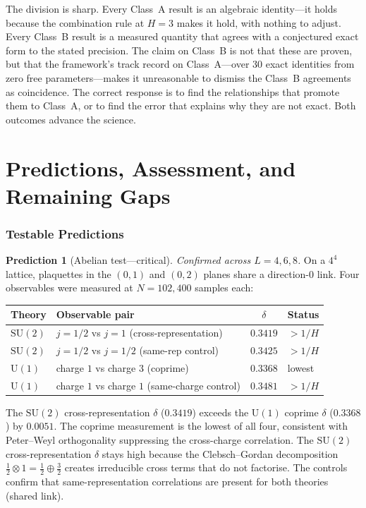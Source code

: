 \documentclass[11pt,a4paper]{article}
\theoremstyle{definition}
\theoremstyle{remark}
\newcommand{\SU}{\mathrm{SU}}
\begin{document}
The division is sharp. Every Class~A result is an algebraic identity---it holds because the combination rule at $H=3$ makes it hold, with nothing to adjust. Every Class~B result is a measured quantity that agrees with a conjectured exact form to the stated precision. The claim on Class~B is not that these are proven, but that the framework's track record on Class~A---over 30 exact identities from zero free parameters---makes it unreasonable to dismiss the Class~B agreements as coincidence. The correct response is to find the relationships that promote them to Class~A, or to find the error that explains why they are not exact. Both outcomes advance the science.


\part{Predictions, Assessment, and Remaining Gaps}\label{part:F}

\section{Testable Predictions}\label{sec:predictions}

\textbf{Prediction 1} (Abelian test---critical). \emph{Confirmed across $L=4,6,8$.} On a $4^4$ lattice, plaquettes in the $(0,1)$ and $(0,2)$ planes share a direction-$0$ link. Four observables were measured at $N=102{,}400$ samples each:

\begin{center}
\begin{tabular}{llcl}
\toprule
Theory & Observable pair & $\delta$ & Status \\
\midrule
$\SU(2)$ & $j\!=\!1/2$ vs $j\!=\!1$ (cross-representation) & $0.3419$ & $>\!1/H$ \\
$\SU(2)$ & $j\!=\!1/2$ vs $j\!=\!1/2$ (same-rep control) & $0.3425$ & $>\!1/H$ \\
$\mathrm{U}(1)$ & charge $1$ vs charge $3$ (coprime) & $0.3368$ & lowest \\
$\mathrm{U}(1)$ & charge $1$ vs charge $1$ (same-charge control) & $0.3481$ & $>\!1/H$ \\
\bottomrule
\end{tabular}
\end{center}

The $\SU(2)$ cross-representation $\delta$ ($0.3419$) exceeds the $\mathrm{U}(1)$ coprime $\delta$ ($0.3368$) by $0.0051$. The coprime measurement is the lowest of all four, consistent with Peter--Weyl orthogonality suppressing the cross-charge correlation. The $\SU(2)$ cross-representation $\delta$ stays high because the Clebsch--Gordan decomposition $\frac{1}{2}\otimes 1=\frac{1}{2}\oplus\frac{3}{2}$ creates irreducible cross terms that do not factorise. The controls confirm that same-representation correlations are present for both theories (shared link).
\end{document}
